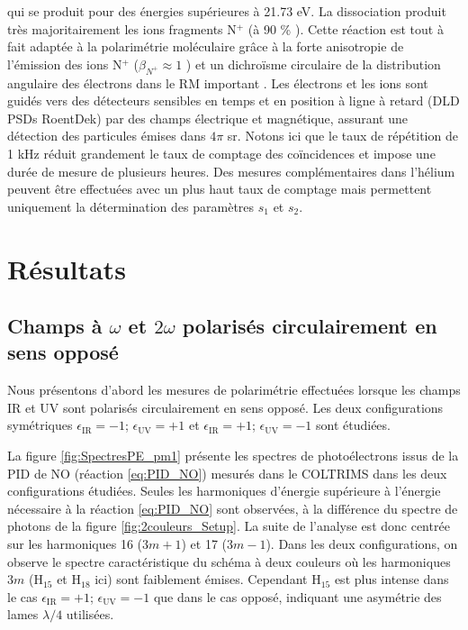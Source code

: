 qui se produit pour des énergies supérieures à 21.73 eV. La dissociation produit très majoritairement les ions fragments N$^+$ (à 90 \% ). Cette réaction est tout à fait adaptée à la polarimétrie moléculaire grâce à la forte anisotropie de  l'émission des ions N$^+$ ($\beta_{N^+} \approx 1$ ) et un dichroïsme circulaire de la distribution angulaire des électrons dans le RM important . Les électrons et les ions sont guidés vers des détecteurs sensibles en temps et en position à ligne à retard (DLD PSDs RoentDek) par des champs électrique et magnétique, assurant une détection des particules émises dans $4\pi$ sr. Notons ici que le taux de répétition de 1 kHz réduit grandement le taux de comptage des coïncidences et impose une durée de mesure de plusieurs heures. Des mesures complémentaires dans l'hélium peuvent être effectuées avec un plus haut taux de comptage mais permettent uniquement la détermination des paramètres $s_1$ et $s_2$.

\section{Résultats}
\subsection{Champs à $\omega$ et $2\omega$ polarisés circulairement en sens opposé}
Nous présentons d'abord les mesures de polarimétrie effectuées lorsque les champs IR et UV sont polarisés circulairement en sens opposé. Les deux configurations symétriques $\epsilon_{\text{IR}} = -1$; $\epsilon_{\text{UV}} = +1$ et $\epsilon_{\text{IR}} = +1$; $\epsilon_{\text{UV}} = -1$ sont étudiées.

La figure \ref{fig:SpectresPE_pm1} présente les spectres de photoélectrons issus de la PID de NO (réaction \ref{eq:PID_NO}) mesurés dans le COLTRIMS dans les deux configurations étudiées. Seules les harmoniques d'énergie supérieure à l'énergie nécessaire à la réaction \ref{eq:PID_NO} sont observées, à la différence du spectre de photons de la figure \ref{fig:2couleurs_Setup}. La suite de l'analyse est donc centrée sur les harmoniques 16 ($3m+1$) et 17 ($3m-1$). Dans les deux configurations, on observe le spectre caractéristique du schéma à deux couleurs où les harmoniques $3m$ (H$_{15}$ et H$_{18}$ ici) sont faiblement émises. Cependant H$_{15}$ est plus intense dans le cas $\epsilon_{\text{IR}} = +1$; $\epsilon_{\text{UV}} = -1$ que dans le cas opposé, indiquant une asymétrie des lames $\lambda/4$ utilisées.

